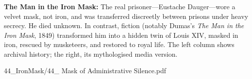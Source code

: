 \begin{SideNotePage}{
  \textbf{The Man in the Iron Mask:}  
  The real prisoner—Eustache Dauger—wore a velvet mask, not iron, and was transferred discreetly between prisons under heavy secrecy. He died unknown. In contrast, fiction (notably Dumas's \textit{The Man in the Iron Mask}, 1849) transformed him into a hidden twin of Louis XIV, masked in iron, rescued by musketeers, and restored to royal life. The left column shows archival history; the right, its mythologised media version. \par
}{44_IronMask/44_ Mask of Administrative Silence.pdf}
\end{SideNotePage}
